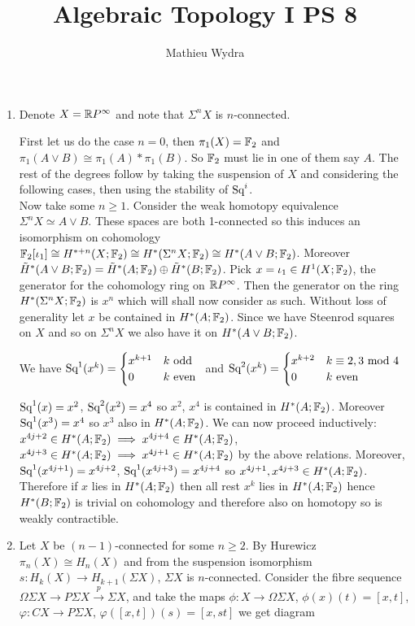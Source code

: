 \documentclass[10pt,a4paper]{article}
\title{Algebraic Topology I PS 8}
\author{Mathieu Wydra}
\begin{document}
\maketitle
\begin{enumerate}
\item Denote $X = \mathbb{R} P^\infty $ and note that $\Sigma^n X $ is $n$-connected.


First let us do the case $n=0$, then $\pi_1(X) = \mathbb{F}_2$ and $\pi_1(A\vee B)\cong \pi_1(A) * \pi_1(B)$. So $\mathbb{F}_2$ must lie in one of them say $A$. The rest of the degrees follow by taking the suspension of $X$ and considering the following cases, then using the stability of $\text{Sq}^i$.\\
Now take some $n\geq 1$. Consider the weak homotopy equivalence $\Sigma^n X \simeq A\vee B$. These spaces are both 1-connected so this induces an isomorphism on cohomology $\mathbb{F}_2[\iota_1] \cong H^{*+n}(X;\mathbb{F}_2)\cong H^*(\Sigma^n X;\mathbb{F}_2)\cong H^*(A\vee B;\mathbb{F}_2)$. Moreover $\tilde{H}^*(A\vee B;\mathbb{F}_2) = \tilde{H}^*(A;\mathbb{F}_2)\oplus \tilde{H}^*(B;\mathbb{F}_2)$. Pick $x = \iota_1\in H^1(X;\mathbb{F}_2)$, the generator for the cohomology ring on $\mathbb{R} P^\infty$. Then the generator on the ring $H^*(\Sigma^n X;\mathbb{F}_2)$ is $x^n$ which will shall now consider as such. Without loss of generality let $x$ be contained in  $H^*(A;\mathbb{F}_2)$. Since we have Steenrod squares on $X$ and so on $\Sigma^n X$ we also have it on $H^*(A\vee B;\mathbb{F}_2)$.

We have $\text{Sq}^1(x^k) = \begin{cases} x^{k+1} & k \text{ odd }\\
0 & k \text{ even }
\end{cases}$ and  $\text{Sq}^2(x^k) = \begin{cases} x^{k+2} & k \equiv 2,3 \text{ mod } 4\\
0 & k \text{ even }
\end{cases}$

$\text{Sq}^1(x) = x^2$, $\text{Sq}^2(x^2) = x^4$ so $x^2$, $x^4$ is contained in $H^*(A;\mathbb{F}_2)$. Moreover $\text{Sq}^1(x^3) = x^4$ so $x^3$ also in $H^*(A;\mathbb{F}_2)$. We can now proceed inductively: $x^{4j+2}\in H^*(A;\mathbb{F}_2)\implies x^{4j+4}\in H^*(A;\mathbb{F}_2)$, $x^{4j+3}\in H^*(A;\mathbb{F}_2)\implies x^{4j+1}\in H^*(A;\mathbb{F}_2)$ by the above relations. Moreover, $\text{Sq}^1(x^{4j+1}) = x^{4j+2}$, $\text{Sq}^1(x^{4j+3}) =  x^{4j+4}$ so $x^{4j+1},x^{4j+3}\in H^*(A;\mathbb{F}_2)$. Therefore if $x$ lies in $H^*(A;\mathbb{F}_2)$ then all rest $x^k$ lies in $H^*(A;\mathbb{F}_2)$ hence $H^*(B;\mathbb{F}_2)$ is trivial on cohomology and therefore also on homotopy so is weakly contractible. 
\item Let $X$ be $(n-1)$-connected for some $n\geq 2$. By Hurewicz $\pi_n(X)\cong H_n(X)$ and from the suspension isomorphism $s:H_k(X)\to H_{k+1}(\Sigma X)$, $\Sigma X$ is $n$-connected. Consider the fibre sequence $\Omega\Sigma X\to P \Sigma X \xrightarrow{p} \Sigma X$, and take the maps $\phi: X\to \Omega \Sigma X$, $\phi(x)(t) = [x,t]$, $\varphi:CX\to P\Sigma X$, $\varphi([x,t])(s) = [x,st]$ we get diagram


\end{enumerate}
\end{document}
